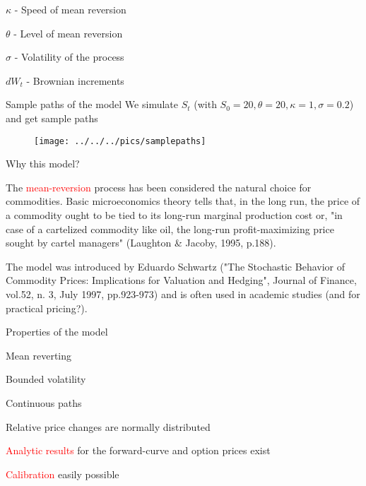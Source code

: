 {%




	$\kappa$ - Speed of mean reversion


	$\theta$ - Level of mean reversion


	$\sigma$ - Volatility of the process


	$dW_t$ - Brownian increments





{Sample paths of the model}
We simulate $S_t$ (with $S_0=20, \theta = 20, \kappa = 1, \sigma = 0.2$) and get sample paths
\begin{figure}
	\centering
		\texttt{[image: ../../../pics/samplepaths]}
	\label{fig:samplepahts}
\end{figure}

{Why this model?}






	The \textcolor{red}{mean-reversion} process has been considered the natural choice for commodities. Basic microeconomics theory tells that, in the long run, the price of a commodity ought to be tied to its long-run marginal production cost or, "in case of a cartelized commodity like oil, the long-run profit-maximizing price sought by cartel managers" (Laughton \& Jacoby, 1995, p.188).


	The model was introduced by Eduardo Schwartz ("The Stochastic Behavior of Commodity Prices: Implications for Valuation and Hedging", Journal of Finance, vol.52, n. 3, July 1997, pp.923-973) and is often used in academic studies (and for practical pricing?).





{Properties of the model}






	Mean reverting


	Bounded volatility


	Continuous paths


	Relative price changes are normally distributed


	\textcolor{red}{Analytic results} for the forward-curve and option prices exist


	\textcolor{red}{Calibration} easily possible





}
